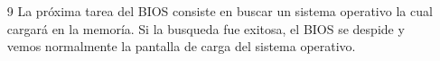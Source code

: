 \begin{enumerate}
		

		\item[9] La próxima tarea del BIOS consiste en buscar un sistema operativo
			la cual cargará en la memoría. Si la busqueda fue exitosa, el BIOS se despide
			y vemos normalmente la pantalla de carga del sistema operativo.

	\end{enumerate}
	\newpage

